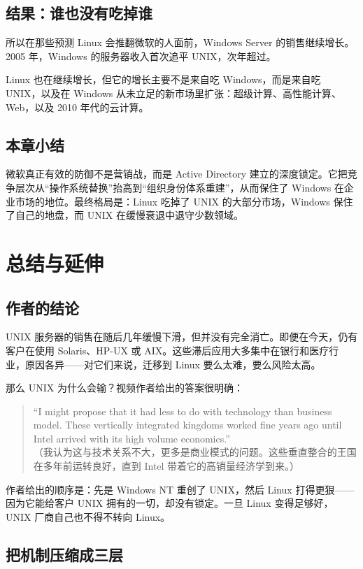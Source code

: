 \documentclass[a4paper]{article}
\begin{document}
\subsection{结果：谁也没有吃掉谁}

所以在那些预测 Linux 会推翻微软的人面前，Windows Server 的销售继续增长。2005 年，Windows 的服务器收入首次追平 UNIX，次年超过。

Linux 也在继续增长，但它的增长主要不是来自吃 Windows，而是来自吃 UNIX，以及在 Windows 从未立足的新市场里扩张：超级计算、高性能计算、Web，以及 2010 年代的云计算。

\subsection{本章小结}
微软真正有效的防御不是营销战，而是 Active Directory 建立的深度锁定。它把竞争层次从“操作系统替换”抬高到“组织身份体系重建”，从而保住了 Windows 在企业市场的地位。最终格局是：Linux 吃掉了 UNIX 的大部分市场，Windows 保住了自己的地盘，而 UNIX 在缓慢衰退中退守少数领域。

\section{总结与延伸}

\subsection{作者的结论}

UNIX 服务器的销售在随后几年缓慢下滑，但并没有完全消亡。即便在今天，仍有客户在使用 Solaris、HP-UX 或 AIX。这些滞后应用大多集中在银行和医疗行业，原因各异——对它们来说，迁移到 Linux 要么太难，要么风险太高。

那么 UNIX 为什么会输？视频作者给出的答案很明确：

\begin{quote}
“I might propose that it had less to do with technology than business model. These vertically integrated kingdoms worked fine years ago until Intel arrived with its high volume economics.”\\
（我认为这与技术关系不大，更多是商业模式的问题。这些垂直整合的王国在多年前运转良好，直到 Intel 带着它的高销量经济学到来。）
\end{quote}

作者给出的顺序是：先是 Windows NT 重创了 UNIX，然后 Linux 打得更狠——因为它能给客户 UNIX 拥有的一切，却没有锁定。一旦 Linux 变得足够好，UNIX 厂商自己也不得不转向 Linux。

\subsection{把机制压缩成三层}
\end{document}
